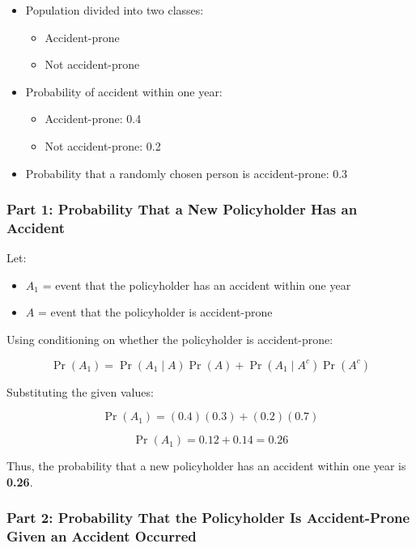 \documentclass[12pt]{article}
\begin{document}
\begin{itemize}
    \item Population divided into two classes:
    \begin{itemize}
        \item Accident-prone
        \item Not accident-prone
    \end{itemize}
    \item Probability of accident within one year:
    \begin{itemize}
        \item Accident-prone: 0.4
        \item Not accident-prone: 0.2
    \end{itemize}
    \item Probability that a randomly chosen person is accident-prone: 0.3
\end{itemize}

\subsubsection*{Part 1: Probability That a New Policyholder Has an Accident}

Let:

\begin{itemize}
    \item $A_1$ = event that the policyholder has an accident within one year
    \item $A$ = event that the policyholder is accident-prone
\end{itemize}

Using conditioning on whether the policyholder is accident-prone:

\[
\Pr(A_1) = \Pr(A_1 \mid A)\Pr(A) + \Pr(A_1 \mid A^{c})\Pr(A^{c})
\]

Substituting the given values:

\[
\Pr(A_1) = (0.4)(0.3) + (0.2)(0.7)
\]

\[
\Pr(A_1) = 0.12 + 0.14 = 0.26
\]

Thus, the probability that a new policyholder has an accident within one year is \textbf{0.26}.

\hrulefill

\subsubsection*{Part 2: Probability That the Policyholder Is Accident-Prone Given an Accident Occurred}
\end{document}
